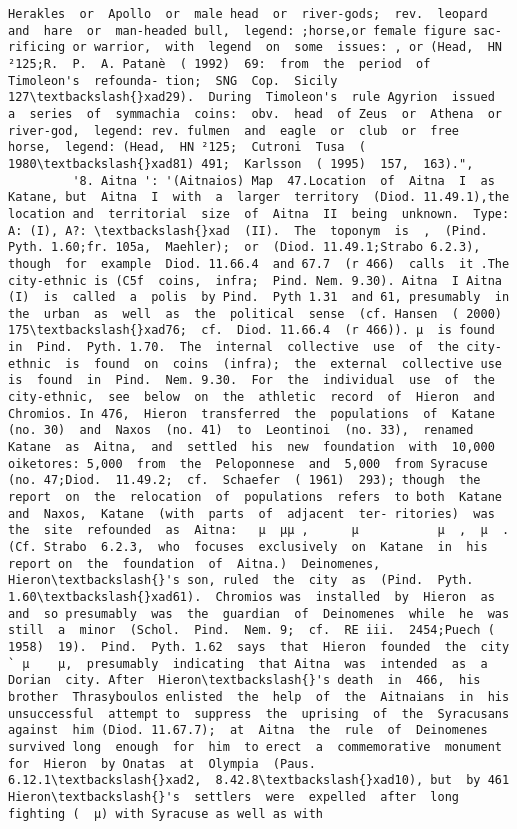 \documentclass[11pt]{article}
\begin{document}
\begin{Verbatim}[commandchars=\\\{\}]
Herakles  or  Apollo  or  male head  or  river-gods;  rev.  leopard  and  hare  or  man-headed bull,  legend: ;horse,or female figure sac- rificing or warrior,  with  legend  on  some  issues: , or (Head,  HN ²125;R.  P.  A. Patanè  ( 1992)  69:  from  the  period  of  Timoleon's  refounda- tion;  SNG  Cop.  Sicily 127\textbackslash{}xad29).  During  Timoleon's  rule Agyrion  issued  a  series  of  symmachia  coins:  obv.  head  of Zeus  or  Athena  or  river-god,  legend: rev. fulmen  and  eagle  or  club  or  free  horse,  legend: (Head,  HN ²125;  Cutroni  Tusa  ( 1980\textbackslash{}xad81) 491;  Karlsson  ( 1995)  157,  163).",
         '8. Aitna ': '(Aitnaios) Map  47.Location  of  Aitna  I  as  Katane, but  Aitna  I  with  a  larger  territory  (Diod. 11.49.1),the  location and  territorial  size  of  Aitna  II  being  unknown.  Type:  A: (I), A?: \textbackslash{}xad  (II).  The  toponym  is  ,  (Pind.  Pyth. 1.60;fr. 105a,  Maehler);  or  (Diod. 11.49.1;Strabo 6.2.3), though  for  example  Diod. 11.66.4  and 67.7  (r 466)  calls  it .The city-ethnic is (C5f  coins,  infra;  Pind. Nem. 9.30). Aitna  I Aitna  (I)  is  called  a  polis  by Pind.  Pyth 1.31  and 61, presumably  in  the  urban  as  well  as  the  political  sense  (cf. Hansen  ( 2000)  175\textbackslash{}xad76;  cf.  Diod. 11.66.4  (r 466)). µ  is found  in  Pind.  Pyth. 1.70.  The  internal  collective  use  of  the city-ethnic  is  found  on  coins  (infra);  the  external  collective use  is  found  in  Pind.  Nem. 9.30.  For  the  individual  use  of  the city-ethnic,  see  below  on  the  athletic  record  of  Hieron  and Chromios. In 476,  Hieron  transferred  the  populations  of  Katane  (no. 30)  and  Naxos  (no. 41)  to  Leontinoi  (no. 33),  renamed Katane  as  Aitna,  and  settled  his  new  foundation  with  10,000 oiketores: 5,000  from  the  Peloponnese  and  5,000  from Syracuse  (no. 47;Diod.  11.49.2;  cf.  Schaefer  ( 1961)  293); though  the  report  on  the  relocation  of  populations  refers  to both  Katane  and  Naxos,  Katane  (with  parts  of  adjacent  ter- ritories)  was  the  site  refounded  as  Aitna:   µ  µµ ,      µ           µ  ,  µ  .  (Cf. Strabo  6.2.3,  who  focuses  exclusively  on  Katane  in  his  report on  the  foundation  of  Aitna.)  Deinomenes,  Hieron\textbackslash{}'s son, ruled  the  city  as  (Pind.  Pyth. 1.60\textbackslash{}xad61).  Chromios was  installed  by  Hieron  as      and  so presumably  was  the  guardian  of  Deinomenes  while  he  was still  a  minor  (Schol.  Pind.  Nem. 9;  cf.  RE iii.  2454;Puech ( 1958)  19).  Pind.  Pyth. 1.62  says  that  Hieron  founded  the  city ` µ    µ,  presumably  indicating  that Aitna  was  intended  as  a  Dorian  city. After  Hieron\textbackslash{}'s death  in  466,  his  brother  Thrasyboulos enlisted  the  help  of  the  Aitnaians  in  his  unsuccessful  attempt to  suppress  the  uprising  of  the  Syracusans  against  him (Diod. 11.67.7);  at  Aitna  the  rule  of  Deinomenes  survived long  enough  for  him  to erect  a  commemorative  monument for  Hieron  by Onatas  at  Olympia  (Paus. 6.12.1\textbackslash{}xad2,  8.42.8\textbackslash{}xad10), but  by 461  Hieron\textbackslash{}'s  settlers  were  expelled  after  long  fighting (  µ) with Syracuse as well as with 
\end{Verbatim}
\end{document}
